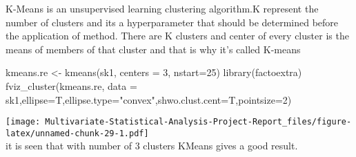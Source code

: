\documentclass[12pt,twoside]{deuthesis}
\newenvironment{Shaded}{\begin{snugshade}}{\end{snugshade}}
\newcommand{\AttributeTok}[1]{\textcolor[rgb]{0.77,0.63,0.00}{#1}}
\newcommand{\DecValTok}[1]{\textcolor[rgb]{0.00,0.00,0.81}{#1}}
\newcommand{\FunctionTok}[1]{\textcolor[rgb]{0.00,0.00,0.00}{#1}}
\newcommand{\NormalTok}[1]{#1}
\newcommand{\OtherTok}[1]{\textcolor[rgb]{0.56,0.35,0.01}{#1}}
\newcommand{\StringTok}[1]{\textcolor[rgb]{0.31,0.60,0.02}{#1}}
\begin{document}
K-Means is an unsupervised learning clustering algorithm.K represent the number of clusters and its a hyperparameter that should be determined before the application of method.
There are K clusters and center of every cluster is the means of members of that cluster and that is why it's called K-means
\begin{Shaded}
\begin{Highlighting}[]
\NormalTok{kmeans.re }\OtherTok{\textless{}{-}} \FunctionTok{kmeans}\NormalTok{(sk1, }\AttributeTok{centers =} \DecValTok{3}\NormalTok{, }\AttributeTok{nstart=}\DecValTok{25}\NormalTok{)}
\FunctionTok{library}\NormalTok{(factoextra)}
\FunctionTok{fviz\_cluster}\NormalTok{(kmeans.re, }\AttributeTok{data =}\NormalTok{ sk1,}\AttributeTok{ellipse=}\NormalTok{T,}\AttributeTok{ellipse.type=}\StringTok{"convex"}\NormalTok{,}\AttributeTok{shwo.clust.cent=}\NormalTok{T,}\AttributeTok{pointsize=}\DecValTok{2}\NormalTok{)}
\end{Highlighting}
\end{Shaded}
\texttt{[image: Multivariate-Statistical-Analysis-Project-Report\_files/figure-latex/unnamed-chunk-29-1.pdf]}\\
\setlength{\parindent}{0in}
it is seen that with number of 3 clusters KMeans gives a good result.
\end{document}
